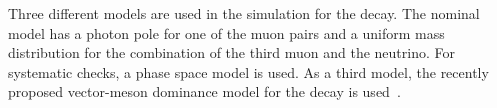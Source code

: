 Three different models are used in the simulation for the \Bmumumu decay. The nominal model has a photon pole for one of the muon pairs and a uniform mass distribution for the combination of the third muon and the neutrino. For systematic checks, a phase space model is used. As a third model, the recently proposed vector-meson dominance model for the decay is used~\cite{Danilina:2018uzr}. 
